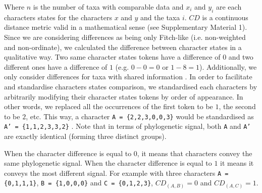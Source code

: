 \documentclass[12pt,letterpaper]{article}
\begin{document}
\noindent Where $n$ is the number of taxa with comparable data and $x_i$ and $y_i$ are each characters states for the characters $x$ and $y$ and the taxa $i$.
$CD$ is a continuous distance metric valid in a mathematical sense (see Supplementary Material 1).
Since we are considering differences as being only Fitch-like (i.e. non-weighted and non-ordinate), we calculated the difference between character states in a qualitative way.
Two same character states tokens have a difference of $0$ and two different ones have a difference of $1$ (e.g. $0 - 0 = 0$ or $1 - 8 = 1$).
Additionally, we only consider differences for taxa with shared information \citep[i.e. a Gower distance;][]{GowerDist}.
In order to facilitate and standardise characters states comparison, we standardised each characters by arbitrarily modifying their character states tokens by order of appearance.
In other words, we replaced all the occurrences of the first token to be $1$, the second to be $2$, etc.
This way, a character \texttt{A = \{2,2,3,0,0,3\}} would be standardised as \texttt{A' = \{1,1,2,3,3,2\}} \citep[following the \textit{xyz} notation in][p.13]{felsenstein2004inferring}.
Note that in terms of phylogenetic signal, both \texttt{A} and \texttt{A'} are exactly identical (forming three distinct groups).

When the character difference is equal to $0$, it means that characters convey the same phylogenetic signal.
When the character difference is equal to $1$ it means it conveys the most different signal.
For example with three characters \texttt{A = \{0,1,1,1\}}, \texttt{B = \{1,0,0,0\}} and \texttt{C = \{0,1,2,3\}}, $CD_{(A,B)} = 0$ and $CD_{(A,C)} = 1$.
\end{document}
